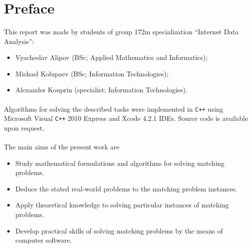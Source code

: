 \section{Preface}

\paragraph{}
	This report was made by students of group 172m specialization ``Internet Data Analysis'':

\begin{itemize}
	\item Vyacheslav Alipov (BSc; Applied Mathematics and Informatics);
	\item Michael Kolupaev (BSc; Information Technologies);
	\item Alexander Kouprin (specialist; Information Technologies).
\end{itemize}

\paragraph{}
	Algorithms for solving the described tasks were implemented in \verb!C++! using Microsoft Visual \verb!C++! 2010 Express and Xcode 4.2.1 IDEs. Source code is available upon request.

\paragraph{}
	The main aims of the present work are 
\begin{itemize}
	\item Study mathematical formulations and algorithms for solving matching problems.
	\item Deduce the stated real-world problems to the matching problem instances.
	\item Apply theoretical knowledge to solving particular instances of matching problems.
	\item Develop practical skills of solving matching problems by the means of computer software.
\end{itemize}
